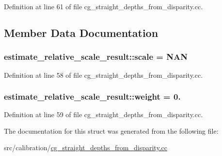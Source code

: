 Definition at line 61 of file cg\+\_\+straight\+\_\+depths\+\_\+from\+\_\+disparity.\+cc.



\subsection{Member Data Documentation}
\subsubsection[{\texorpdfstring{scale}{scale}}]{ estimate\+\_\+relative\+\_\+scale\+\_\+result\+::scale = N\+AN}\hypertarget{structestimate__relative__scale__result_ab8367cf20aa2079710e5bdbdc8962713}{}\label{structestimate__relative__scale__result_ab8367cf20aa2079710e5bdbdc8962713}


Definition at line 58 of file cg\+\_\+straight\+\_\+depths\+\_\+from\+\_\+disparity.\+cc.

\subsubsection[{\texorpdfstring{weight}{weight}}]{ estimate\+\_\+relative\+\_\+scale\+\_\+result\+::weight = 0.}\hypertarget{structestimate__relative__scale__result_a42f8a6166b65c51e165a3c0ebca2a8d2}{}\label{structestimate__relative__scale__result_a42f8a6166b65c51e165a3c0ebca2a8d2}


Definition at line 59 of file cg\+\_\+straight\+\_\+depths\+\_\+from\+\_\+disparity.\+cc.



The documentation for this struct was generated from the following file\+:\begin{DoxyCompactItemize}
\item 
src/calibration/\hyperlink{cg__straight__depths__from__disparity_8cc}{cg\+\_\+straight\+\_\+depths\+\_\+from\+\_\+disparity.\+cc}\end{DoxyCompactItemize}
